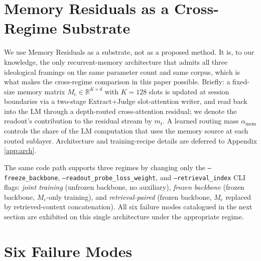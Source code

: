 \documentclass{article}
\newcommand{\Mc}{M_{\mathrm{c}}}
\newcommand{\mt}{m_t}
\newcommand{\amem}{\alpha_{\mathrm{mem}}}
\begin{document}
\section{Memory Residuals as a Cross-Regime Substrate}
\label{sec:memres}

We use Memory Residuals as a substrate, not as a proposed method.
It is, to our knowledge, the only recurrent-memory architecture
that admits all three ideological framings on the same parameter
count and same corpus, which is what makes the cross-regime
comparison in this paper possible.  Briefly: a fixed-size memory
matrix $\Mc \in \mathbb{R}^{K \times d}$ with $K=128$ slots is
updated at session boundaries via a two-stage Extract+Judge
slot-attention writer, and read back into the LM through a
depth-routed cross-attention residual; we denote the readout's
contribution to the residual stream by $\mt$.  A learned routing
mass $\amem$ controls the share of the LM computation that uses
the memory source at each routed sublayer.  Architecture and
training-recipe details are deferred to Appendix \ref{app:arch}.

The same code path supports three regimes by changing only the
\texttt{--freeze\_backbone}, \texttt{--readout\_probe\_loss\_weight},
and \texttt{--retrieval\_index} CLI flags: \emph{joint training}
(unfrozen backbone, no auxiliary), \emph{frozen backbone} (frozen
backbone, $\Mc$-only training), and \emph{retrieval-paired} (frozen
backbone, $\Mc$ replaced by retrieved-context concatenation).  All
six failure modes catalogued in the next section are exhibited on
this single architecture under the appropriate regime.

\section{Six Failure Modes}
\label{sec:failure_modes}
\end{document}
